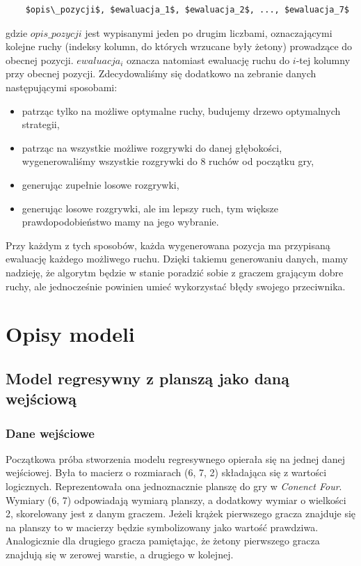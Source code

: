 \documentclass[12pt]{article}
\begin{document}
\begin{lstlisting}
    $opis\_pozycji$, $ewaluacja_1$, $ewaluacja_2$, ..., $ewaluacja_7$
\end{lstlisting}


gdzie $opis\_pozycji$ jest wypisanymi jeden po drugim liczbami, oznaczającymi kolejne ruchy (indeksy kolumn, do których wrzucane były żetony) prowadzące do obecnej pozycji. $ewaluacja_i$ oznacza natomiast ewaluację ruchu do $i$-tej kolumny przy obecnej pozycji. Zdecydowaliśmy się dodatkowo na zebranie danych następującymi sposobami:

\begin{itemize}
    \item patrząc tylko na możliwe optymalne ruchy, budujemy drzewo optymalnych strategii,
    \item patrząc na wszystkie możliwe rozgrywki do danej głębokości, wygenerowaliśmy wszystkie rozgrywki do 8 ruchów od początku gry,
    \item generując zupełnie losowe rozgrywki,
    \item generując losowe rozgrywki, ale im lepszy ruch, tym większe prawdopodobieństwo mamy na jego wybranie.
\end{itemize}

Przy każdym z tych sposobów, każda wygenerowana pozycja ma przypisaną ewaluację każdego możliwego ruchu. Dzięki takiemu generowaniu danych, mamy nadzieję, że algorytm będzie w stanie poradzić sobie z graczem grającym dobre ruchy, ale jednocześnie powinien umieć wykorzystać błędy swojego przeciwnika.

\section{Opisy modeli}

\subsection{Model regresywny z planszą jako daną wejściową}

\subsubsection{Dane wejściowe}

Początkowa próba stworzenia modelu regresywnego opierała się na jednej danej wejściowej. Była to macierz o rozmiarach (6, 7, 2) składająca się z wartości logicznych. Reprezentowała ona jednoznacznie planszę do gry w \textit{Conenct Four}. Wymiary (6, 7) odpowiadają wymiarą planszy, a dodatkowy wymiar o wielkości 2, skorelowany jest z danym graczem. Jeżeli krążek pierwszego gracza znajduje się na planszy to w macierzy będzie symbolizowany jako wartość prawdziwa. Analogicznie dla drugiego gracza pamiętając, że żetony pierwszego gracza znajdują się w zerowej warstie, a drugiego w kolejnej.
\end{document}
